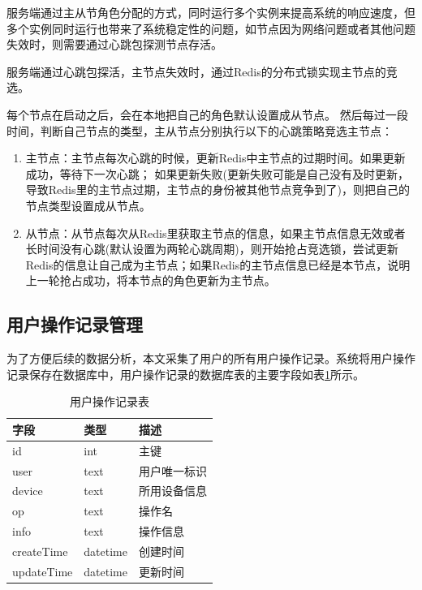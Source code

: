 服务端通过主从节角色分配的方式，同时运行多个实例来提高系统的响应速度，但多个实例同时运行也带来了系统稳定性的问题，如节点因为网络问题或者其他问题失效时，则需要通过心跳包探测节点存活。

服务端通过心跳包探活，主节点失效时，通过Redis的分布式锁实现主节点的竞选。

每个节点在启动之后，会在本地把自己的角色默认设置成从节点。
然后每过一段时间，判断自己节点的类型，主从节点分别执行以下的心跳策略竞选主节点：
\begin{enumerate}
    \item 主节点：主节点每次心跳的时候，更新Redis中主节点的过期时间。如果更新成功，等待下一次心跳； 如果更新失败(更新失败可能是自己没有及时更新，导致Redis里的主节点过期，主节点的身份被其他节点竞争到了)，则把自己的节点类型设置成从节点。
    
    \item 从节点：从节点每次从Redis里获取主节点的信息，如果主节点信息无效或者长时间没有心跳(默认设置为两轮心跳周期)，则开始抢占竞选锁，尝试更新Redis的信息让自己成为主节点；如果Redis的主节点信息已经是本节点，说明上一轮抢占成功，将本节点的角色更新为主节点。
\end{enumerate}


\subsection{用户操作记录管理}
为了方便后续的数据分析，本文采集了用户的所有用户操作记录。系统将用户操作记录保存在数据库中，用户操作记录的数据库表的主要字段如表\ref{tab:op_log}所示。

\begin{table}[]
    \centering
    \caption{用户操作记录表}
    \begin{tabular}{lll}
        \toprule
        字段 & 类型 & 描述 \\
        \midrule
        id & int & 主键 \\
        user & text & 用户唯一标识 \\
        device & text & 所用设备信息 \\
        op & text & 操作名 \\
        info & text & 操作信息 \\
        createTime & datetime & 创建时间 \\
        updateTime & datetime & 更新时间\\
        \bottomrule
    \end{tabular}
    \label{tab:op_log}
\end{table}


